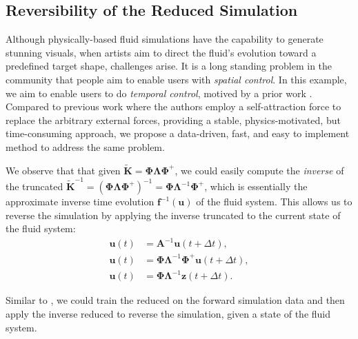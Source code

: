 \subsection{Reversibility of the Reduced Simulation}
Although physically-based fluid simulations have the capability to generate stunning visuals, when artists aim to direct the fluid's evolution toward a predefined target shape, challenges arise. It is a long standing problem in the community that people aim to enable users with \emph{spatial control}. In this example, we aim to enable users to do \emph{temporal control}, motived by a prior work \citet{oborn2018time}. Compared to previous work  where the authors employ a self-attraction force to replace the arbitrary external forces, providing a stable, physics-motivated, but time-consuming approach, we propose a data-driven, fast, and easy to implement method to address the same problem.

\label{sec:reversibility}

We observe that that given $\bm{\tilde{K}} = \bm{\Phi} \bm{\Lambda} \bm{\Phi}^+$, we could easily compute the \emph{inverse} of the truncated \koopman{} $\bm{\tilde{K}}^{-1} = (\bm{\Phi} \bm{\Lambda} \bm{\Phi}^+)^{-1} = \bm{\Phi} \bm{\Lambda}^{-1} \bm{\Phi}^+$, which is essentially the approximate inverse time evolution $\bm{f}^{-1}(\bm u)$ of the fluid system. This allows us to reverse the simulation by applying the inverse truncated \koopman{} to the current state of the fluid system:
\begin{equation}
    \label{eqn:reverse_simulation}
    \begin{aligned}
        \bm{u}(t) &= \bm{A}^{-1} \bm{u}(t + \Delta t), \\
        \bm{u}(t) &= \bm{\Phi} \bm{\Lambda}^{-1}\bm{\Phi}^+ \bm{u}(t + \Delta t), \\
        \bm{u}(t) &= \bm{\Phi} \bm{\Lambda}^{-1} \bm{z}(t + \Delta t).
    \end{aligned}
\end{equation}

Similar to , we could train the reduced \koopman{} on the forward simulation data and then apply the inverse reduced \koopman{} to reverse the simulation, given a state of the fluid system.


